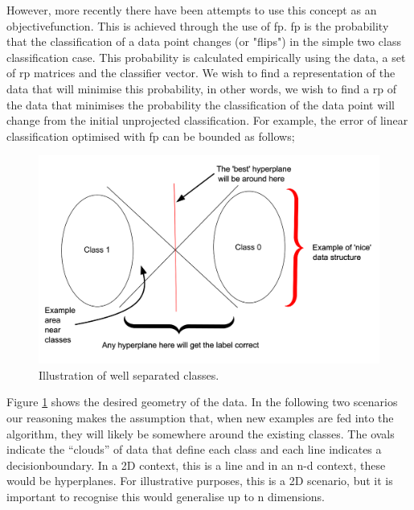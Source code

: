However, more recently there have been attempts to use this concept as an \gls{objectivefunction}. This is achieved through the use of \gls{fp}. \gls{fp} is the probability that the classification of a data point changes (or "flips") in the simple two class classification case. This probability is calculated empirically using the data, a set of \gls{rp} matrices and the classifier vector. We wish to find a representation of the data that will minimise this probability, in other words, we wish to find a \gls{rp} of the data that minimises the probability the classification of the data point will change from the initial unprojected classification.  For example, the error of linear classification optimised with \gls{fp} can be bounded as follows;


\begin{figure}[H]
\centering
\includegraphics[width=\textwidth]{figs/hyperplanes_good_classes.png}
\caption{Illustration of well separated classes.} 
\label{fig:good_sep_classes} %
\end{figure}

Figure \ref{fig:good_sep_classes} shows the desired geometry of the data. In the following two scenarios our reasoning makes the assumption that, when new examples are fed into the algorithm, they will likely be somewhere around the existing classes. The ovals indicate the \enquote{clouds} of data that define each class and each line indicates a \gls{decisionboundary}. In a 2D context, this is a line and in an n-d context, these would be \gls{hyperplane}s.  For illustrative purposes, this is a 2D scenario, but it is important to recognise this would generalise up to n dimensions.  %

